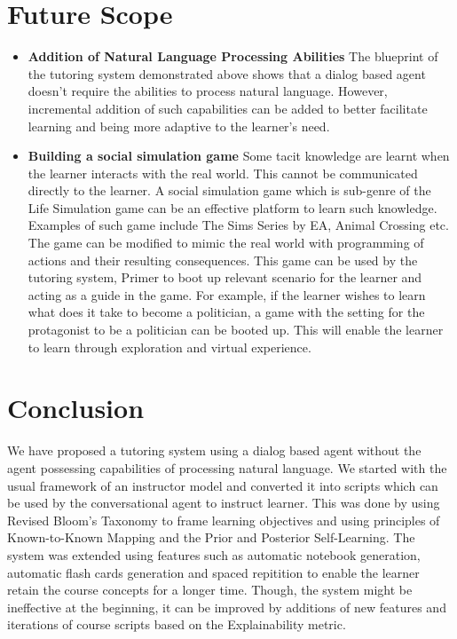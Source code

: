 \documentclass[]{article}
\begin{document}
\section{Future Scope}
\begin{itemize}
\item \textbf{Addition of Natural Language Processing Abilities} The blueprint of the tutoring system demonstrated above shows that a dialog based agent doesn't require the abilities to process natural language. However, incremental addition of such capabilities can be added to better facilitate learning and being more adaptive to the learner's need.
\item \textbf{Building a social simulation game} Some tacit knowledge are learnt when the learner interacts with the real world. This cannot be communicated directly to the learner. A social simulation game which is sub-genre of the Life Simulation game can be an effective platform to learn such knowledge. Examples of such game include The Sims Series by EA, Animal Crossing etc. The game can be modified to mimic the real world with programming of actions and their resulting consequences. This game can be used by the tutoring system, Primer to boot up relevant scenario for the learner and acting as a guide in the game. For example, if the learner wishes to learn what does it take to become a politician, a game with the setting for the protagonist to be a politician can be booted up. This will enable the learner to learn through exploration and virtual experience.   
\end{itemize}

\section{Conclusion}
We have proposed a tutoring system using a dialog based agent without the agent possessing capabilities of processing natural language. We started with the usual framework of an instructor model and converted it into scripts which can be used by the conversational agent to instruct learner. This was done by using Revised Bloom's Taxonomy to frame learning objectives and using principles of Known-to-Known Mapping and the Prior and Posterior Self-Learning. The system was extended using features such as automatic notebook generation, automatic flash cards generation and spaced repitition to enable the learner retain the course concepts for a longer time. Though, the system might be ineffective at the beginning, it can be improved by additions of new features and iterations of course scripts based on the Explainability metric. 
\end{document}

